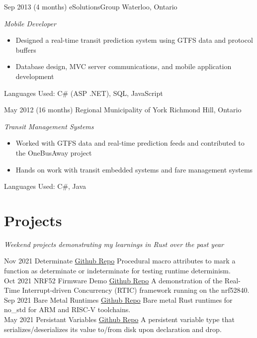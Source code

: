 \documentclass[print]{friggeri-cv} %
\begin{document}
\begin{entrylist}
\entry
{Sep 2013}
{(4 months)}
{eSolutionsGroup}
{Waterloo, Ontario}
{\emph{Mobile Developer}
\begin{itemize}
\item Designed a real-time transit prediction system using GTFS data and protocol buffers
\item Database design, MVC server communications, and mobile application development
\end{itemize}
Languages Used: C\# (ASP .NET), SQL, JavaScript \\
}

\entry
{May 2012}
{(16 months)}
{Regional Municipality of York}
{Richmond Hill, Ontario}
{\emph{Transit Management Systems}
\begin{itemize}
\item Worked with GTFS data and real-time prediction feeds and contributed to the OneBusAway project
\item Hands on work with transit embedded systems and fare management systems
\end{itemize}
Languages Used: C\#, Java \\
}

\end{entrylist}

\section{Projects}
\emph{Weekend projects demonstrating my learnings in Rust over the past year}\\

\begin{entrylist}

\entry
{Nov 2021}
{}
{Determinate}
{\href{https://github.com/Nauscar/determinate}{Github Repo}}
{Procedural macro attributes to mark a function as determinate or indeterminate for testing runtime determinism.}\\

\entry
{Oct 2021}
{}
{NRF52 Firmware Demo}
{\href{https://github.com/Nauscar/nrf52-fw-demo}{Github Repo}}
{A demonstration of the Real-Time Interrupt-driven Concurrency (RTIC) framework running on the nrf52840.}\\

\entry
{Sep 2021}
{}
{Bare Metal Runtimes}
{\href{https://github.com/Nauscar/rt-rs}{Github Repo}}
{Bare metal Rust runtimes for no\_std for ARM and RISC-V toolchains.}\\

\entry
{May 2021}
{}
{Persistant Variables}
{\href{https://github.com/Nauscar/block-rs}{Github Repo}}
{A persistent variable type that serializes/deserializes its value to/from disk upon declaration and drop.}\\
\end{entrylist}
\end{document}
